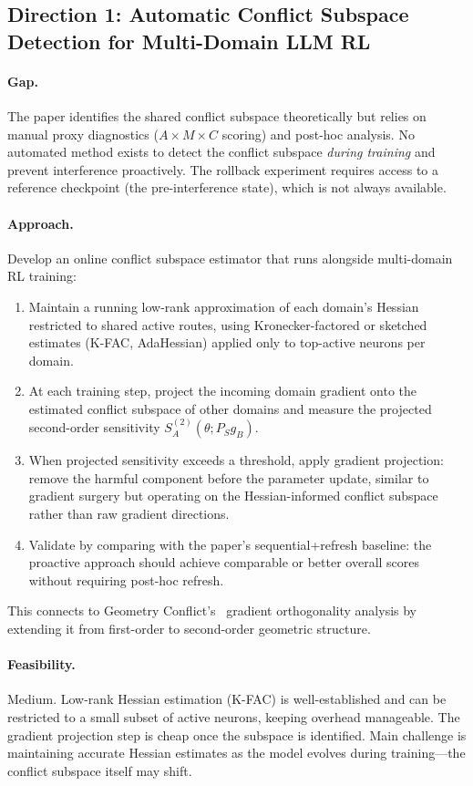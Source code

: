 \documentclass[11pt,a4paper]{article}
\begin{document}
\subsection{Direction 1: Automatic Conflict Subspace Detection for Multi-Domain LLM RL}

\paragraph{Gap.} The paper identifies the shared conflict subspace theoretically but relies on manual proxy diagnostics ($A \times M \times C$ scoring) and post-hoc analysis. No automated method exists to detect the conflict subspace \emph{during training} and prevent interference proactively. The rollback experiment requires access to a reference checkpoint (the pre-interference state), which is not always available.

\paragraph{Approach.} Develop an online conflict subspace estimator that runs alongside multi-domain RL training:
\begin{enumerate}
\item Maintain a running low-rank approximation of each domain's Hessian restricted to shared active routes, using Kronecker-factored or sketched estimates (K-FAC, AdaHessian) applied only to top-active neurons per domain.
\item At each training step, project the incoming domain gradient onto the estimated conflict subspace of other domains and measure the projected second-order sensitivity $S_A^{(2)}(\theta; P_S g_B)$.
\item When projected sensitivity exceeds a threshold, apply gradient projection: remove the harmful component before the parameter update, similar to gradient surgery but operating on the Hessian-informed conflict subspace rather than raw gradient directions.
\item Validate by comparing with the paper's sequential+refresh baseline: the proactive approach should achieve comparable or better overall scores without requiring post-hoc refresh.
\end{enumerate}
This connects to Geometry Conflict's~\cite{geometry2026} gradient orthogonality analysis by extending it from first-order to second-order geometric structure.

\paragraph{Feasibility.} Medium. Low-rank Hessian estimation (K-FAC) is well-established and can be restricted to a small subset of active neurons, keeping overhead manageable. The gradient projection step is cheap once the subspace is identified. Main challenge is maintaining accurate Hessian estimates as the model evolves during training---the conflict subspace itself may shift.
\end{document}
